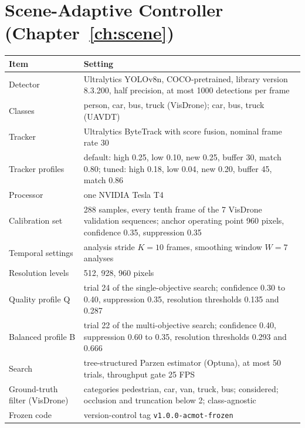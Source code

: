 \section{Scene-Adaptive Controller (Chapter~\ref{ch:scene})}
\begin{longtable}{@{}p{4.6cm}p{9.8cm}@{}}
\toprule
Item & Setting \\
\midrule
Detector & Ultralytics YOLOv8n, COCO-pretrained, library version 8.3.200, half precision, at most 1000 detections per frame \\
Classes & person, car, bus, truck (VisDrone); car, bus, truck (UAVDT) \\
Tracker & Ultralytics ByteTrack with score fusion, nominal frame rate 30 \\
Tracker profiles & default: high 0.25, low 0.10, new 0.25, buffer 30, match 0.80; tuned: high 0.18, low 0.04, new 0.20, buffer 45, match 0.86 \\
Processor & one NVIDIA Tesla T4 \\
Calibration set & 288 samples, every tenth frame of the 7 VisDrone validation sequences; anchor operating point 960 pixels, confidence 0.35, suppression 0.35 \\
Temporal settings & analysis stride $K=10$ frames, smoothing window $W=7$ analyses \\
Resolution levels & 512, 928, 960 pixels \\
Quality profile Q & trial 24 of the single-objective search; confidence 0.30 to 0.40, suppression 0.35, resolution thresholds 0.135 and 0.287 \\
Balanced profile B & trial 22 of the multi-objective search; confidence 0.40, suppression 0.60 to 0.35, resolution thresholds 0.293 and 0.666 \\
Search & tree-structured Parzen estimator (Optuna), at most 50 trials, throughput gate 25 FPS \\
Ground-truth filter (VisDrone) & categories pedestrian, car, van, truck, bus; considered; occlusion and truncation below 2; class-agnostic \\
Frozen code & version-control tag \texttt{v1.0.0-acmot-frozen} \\
\bottomrule
\end{longtable}

